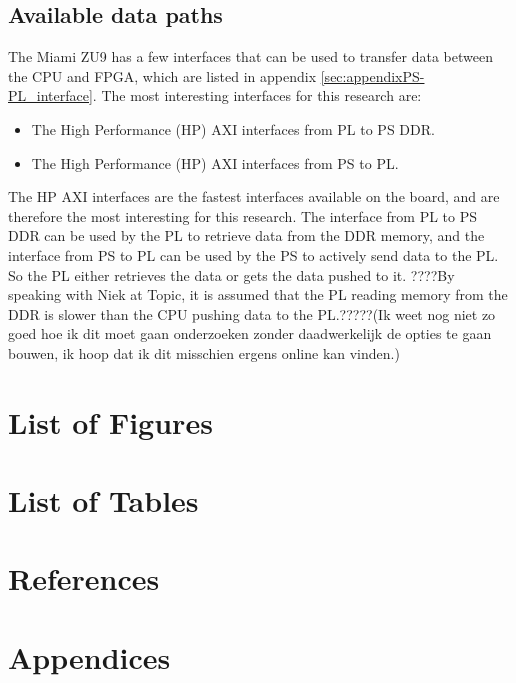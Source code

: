 \documentclass{article}
\begin{document}
\subsection{Available data paths}
The Miami ZU9 has a few interfaces that can be used to transfer data between the CPU and FPGA, which are listed in appendix \ref{sec:appendixPS-PL_interface}.
The most interesting interfaces for this research are:
\begin{itemize}
    \item The High Performance (HP) AXI interfaces from PL to PS DDR.
    \item The High Performance (HP) AXI interfaces from PS to PL.
\end{itemize}
The HP AXI interfaces are the fastest interfaces available on the board, and are therefore the most interesting for this research. 
The interface from PL to PS DDR can be used by the PL to retrieve data from the DDR memory, and the interface from PS to PL can be used by the PS to actively send data to the PL.
So the PL either retrieves the data or gets the data pushed to it.
????By speaking with Niek at Topic, it is assumed that the PL reading memory from the DDR is slower than the CPU pushing data to the PL.?????(Ik weet nog niet zo goed hoe ik dit moet gaan onderzoeken zonder daadwerkelijk de opties te gaan bouwen, ik hoop dat ik dit misschien ergens online kan vinden.)




\newpage

\section{List of Figures}

\section{List of Tables}

\section{References}
\printbibliography

\newpage

\section{Appendices}
\appendix
\end{document}
